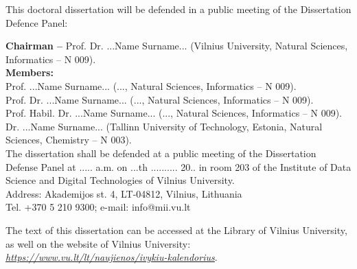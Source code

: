 \vspace{1cm}
\noindent
This doctoral dissertation will be defended in a public meeting of the Dissertation Defence Panel:

\vspace{0.5cm}
\noindent
{\bf Chairman  --} \nohyphens{{Prof. Dr. ...Name Surname...} (Vilnius University, Natural Sciences, Informatics -- N 009)}.\\ %
{\bf Members:}\\ %
\nohyphens{Prof. ...Name Surname...}
(..., Natural Sciences, Informatics -- N 009).\\%
\nohyphens{Prof. Dr. ...Name Surname...}
(..., Natural Sciences, Informatics -- N 009).\\
\nohyphens{Prof. Habil. Dr. ...Name Surname...} 
(..., Natural Sciences, Informatics -- N 009).\\
\nohyphens{Dr. ...Name Surname...}
(Tallinn University of Technology, Estonia, Natural Sciences, Chemistry -- N 003).\\

\vspace{2cm}
\noindent 
The dissertation shall be defended at a public meeting of the Dissertation Defense Panel at ..... a.m. on ...th .......... 20.. in room 203 of the Institute of Data Science and Digital Technologies of Vilnius University. \\
Address: Akademijos st. 4, LT-04812, Vilnius, Lithuania \\
Tel. +370 5 210 9300; e-mail: info@mii.vu.lt

\vspace{1cm}
\noindent
The text of this dissertation can be accessed at the Library of Vilnius
University, as well on the website of Vilnius University: \\ 
\href{https://www.vu.lt/lt/naujienos/ivykiu-kalendorius}{ \textit{\underline{https://www.vu.lt/lt/naujienos/ivykiu-kalendorius}}}.



